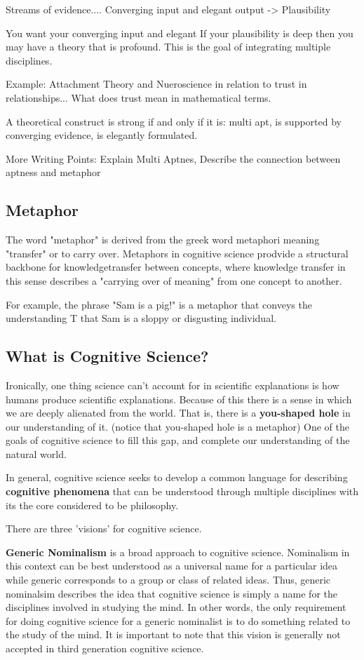 \documentclass[twoside]{article}
\begin{document}
Streams of evidence....
Converging input and elegant output -> Plausibility

You want your converging input and elegant
If your plausibility is deep then you may have a theory that is profound. This is
the goal of integrating multiple disciplines.

Example: Attachment Theory and Nueroscience in relation to trust in relationships...
What does trust mean in mathematical terms.

A theoretical construct is strong if and only if it is: multi apt, is supported by converging evidence, is
elegantly formulated.

More Writing Points: Explain Multi Aptnes, Describe the connection between aptness
and metaphor

\subsection{Metaphor}
The word "metaphor" is derived from the greek word metaphori meaning "transfer"
or to carry over. Metaphors in cognitive science prodvide a structural backbone
for knowledgetransfer between concepts, where knowledge transfer in this sense
describes a "carrying over of meaning" from one concept to another.

For example, the phrase "Sam is a pig!" is a metaphor that conveys the understanding T
that Sam is a sloppy or disgusting individual.


\subsection{What is Cognitive Science?}
Ironically, one thing science can't account for in scientific explanations is how
humans produce scientific explanations. Because of this there is a sense in which we are deeply
alienated from the world. That is, there is a \textbf{you-shaped hole} in
our understanding of it. (notice that you-shaped hole is a metaphor) One of the goals
of cognitive science to fill this gap, and complete our understanding of the natural world.

In general, cognitive science seeks to develop a common language for describing \textbf{cognitive phenomena}
that can be understood through multiple disciplines with its the core considered to be philosophy.

There are three 'visions' for cognitive science.

\textbf{Generic Nominalism} is a broad approach to cognitive science. Nominalism
in this context can be best understood as a universal name for a particular idea while
generic corresponds to a group or class of related ideas. Thus, generic nominalsim
describes the idea that cognitive science is simply a name for the disciplines
involved in studying the mind. In other words, the only requirement for doing
cognitive science for a generic nominalist is to do something related to the study
of the mind. It is important to note that this vision is generally not accepted
in third generation cognitive science.
\end{document}
